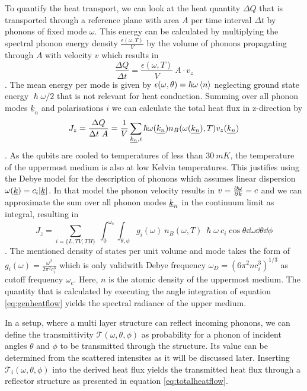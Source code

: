 To quantify the heat transport, we can look at the heat quantity $\Delta Q$
that is transported through a reference plane with area $A$ per time interval
$\Delta t$ by phonons of fixed mode $\omega$. This energy can be calculated by
multiplying the spectral phonon energy density $\frac{\epsilon(\omega,T)}{V}$
by the volume of phonons propagating through $A$ with velocity $v$ which
results in
\begin{equation}
    \frac{\Delta Q}{\Delta t} = \frac{\epsilon(\omega, T)}{V}\ A\cdot v_z
\end{equation}
. The mean energy per mode is given by $\epsilon(\omega, \theta) = \hslash
    \omega \expval{n}$ neglecting ground state energy $\hslash \omega / 2$
that is not relevant for heat conduction. Summing over all phonon modes
$\underline{k}_n$ and polarisations $i$ we can calculate the total heat flux
in z-direction by
\begin{equation}
    J_z = \frac{\Delta Q}{\Delta t\ A} = \frac{1}{V} \sum\limits_{
        \underline{k_n}, i}\hslash \omega(\underline{k_n})
    n_B(\omega(\underline{k_n}),T) v_z(\underline{k_n})
\end{equation}
.
As the qubits are cooled to temperatures of less than $\SI{30}{mK}$, the
temperature of the uppermost medium is also at low Kelvin temperatures. This
justifies using the Debye model for the description of phonons which assumes
linear dispersion $\omega(\underline{k})=c_i |\underline{k}|$.
In that model the phonon velocity results in $v = \frac{\partial \omega}{\partial k}=c$ and we
can
approximate the
sum over all phonon modes $\underline{k}_n$ in the continuum limit as integral,
resulting in
\begin{equation}\label{eq:genheatflow}
    J_z = \sum\limits_{i=\{L,TV,TH\}}\ \int_0^{\omega_c}\int_{\theta, \phi}
    g_i(\omega)\ n_B(\omega, T)\
    \hslash \omega\  c_i\cos \theta \dd{\omega} \dd{\theta}\dd{\phi}
\end{equation}
. The mentioned density of states per unit volume and mode takes the form of
$g_i(\omega)= \frac{\omega^2}{2\pi^2 c_i^3}$ \cite{Simon2016} which is only
validwith Debye frequency $\omega_D = (6\pi^2 n c_i^3)^{1/3}$ as cutoff
frequency $\omega_c$. Here, $n$ is the atomic density of the uppermost medium.
The quantity that is calculated by executing the angle integration of equation
\ref{eq:genheatflow} yields the spectral radiance of the upper medium.

In a setup, where a multi layer structure can reflect incoming phonons,
we can define the transmittivity $\mathcal{T}(\omega,\theta, \phi)$ as
probability for a phonon of incident angles $\theta$ and $\phi$ to be
transmitted through the structure. Its value can be determined from
the scattered intensites as it will be discussed later. Inserting
$\mathcal{T}_i(\omega, \theta, \phi)$ into the derived heat flux yields
the transmitted heat flux through a reflector structure as presented in
equation \ref{eq:totalheatflow}.

